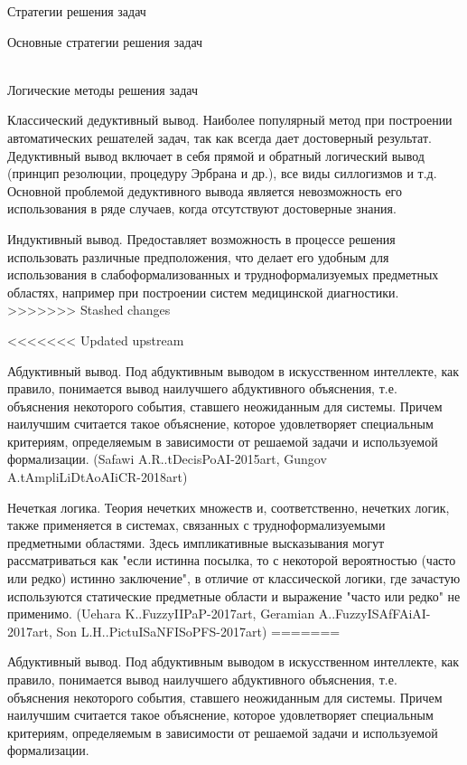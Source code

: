 \begin{frame}{Стратегии решения задач}
\begin{frame}{\large Основные стратегии решения задач}
\begin{textitemize}
\begin{frame}{\\Логические методы решения задач}
    \begin{textitemize}
        \item Классический дедуктивный вывод. Наиболее популярный метод при построении автоматических решателей задач, так как всегда дает достоверный результат. Дедуктивный вывод включает в себя прямой и обратный логический вывод (принцип резолюции, процедуру Эрбрана и др.), все виды силлогизмов и т.д. Основной проблемой дедуктивного вывода является невозможность его использования в ряде случаев, когда отсутствуют достоверные знания.
        \item Индуктивный вывод. Предоставляет возможность в процессе решения использовать различные предположения, что делает его удобным для использования в слабоформализованных и трудноформализуемых предметных областях, например при построении систем медицинской диагностики.
>>>>>>> Stashed changes
    \end{textitemize}
\end{frame}
\begin{frame}{}
    \begin{textitemize}
<<<<<<< Updated upstream
        \item  Абдуктивный вывод. Под абдуктивным выводом в искусственном интеллекте, как правило, понимается вывод наилучшего абдуктивного объяснения, т.е. объяснения некоторого события, ставшего неожиданным для системы. Причем наилучшим считается такое объяснение, которое удовлетворяет специальным критериям, определяемым в зависимости от решаемой задачи и используемой формализации. (Safawi A.R..tDecisPoAI-2015art, Gungov A.tAmpliLiDtAoAIiCR-2018art)
        \item Нечеткая логика. Теория нечетких множеств и, соответственно, нечетких логик, также применяется в системах, связанных с трудноформализуемыми предметными областями. Здесь импликативные высказывания могут рассматриваться как "если истинна посылка, то с некоторой вероятностью (часто или редко) истинно заключение", в отличие от классической логики, где зачастую используются статические предметные области и выражение "часто или редко" не применимо. (Uehara K..FuzzyIIPaP-2017art, Geramian A..FuzzyISAfFAiAI-2017art, Son L.H..PictuISaNFISoPFS-2017art)
=======
        \item  Абдуктивный вывод. Под абдуктивным выводом в искусственном интеллекте, как правило, понимается вывод наилучшего абдуктивного объяснения, т.е. объяснения некоторого события, ставшего неожиданным для системы. Причем наилучшим считается такое объяснение, которое удовлетворяет специальным критериям, определяемым в зависимости от решаемой задачи и используемой формализации.

\end{textitemize}
\end{frame}
\end{textitemize}
\end{frame}
\end{frame}
